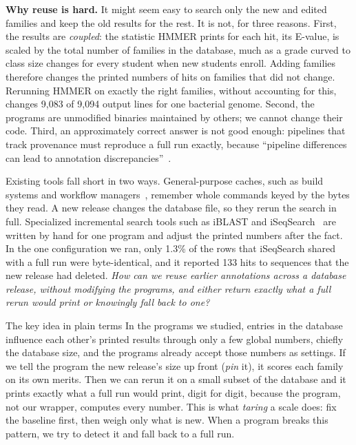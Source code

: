 \documentclass[letterpaper,twocolumn,10pt]{article}
\theoremstyle{definition}
\begin{document}
\textbf{Why reuse is hard.} It might seem easy to search only the new and edited families and keep the old results
for the rest. It is not, for three reasons. First, the results are \textit{coupled}: the statistic HMMER prints for
each hit, its E-value, is scaled by the total number of families in the database, much as a grade curved to class
size changes for every student when new students enroll. Adding families therefore changes the printed numbers of
hits on families that did not change. Rerunning HMMER on exactly the right families, without accounting for this,
changes 9{,}083 of 9{,}094 output lines for one bacterial genome.
Second, the programs are unmodified binaries
maintained by others; we cannot change their code. Third, an approximately correct answer is not good enough:
pipelines that track provenance must reproduce a full run exactly, because ``pipeline differences can lead to
annotation discrepancies''~\cite{chen2021img}.

Existing tools fall short in two ways. General\nobreakdash-purpose caches, such as build systems and workflow
managers~\cite{curtsinger2022riker,xie2026incr,shiptoski2023processcache,ditommaso2017nextflow,molder2021snakemake},
remember whole commands keyed by the bytes they read. A new release changes the database file, so they rerun the
search in full. Specialized incremental search tools such as iBLAST and iSeqSearch~\cite{dash2021iblast,yoo2025iseqsearch}
are written by hand for one program and adjust the printed numbers after the fact. In the one configuration we ran, only 1.3\% of the rows that iSeqSearch shared
with a full run were byte\nobreakdash-identical, and it reported 133 hits to sequences that the new release had deleted.
\textit{How can we reuse earlier annotations across a database release, without modifying the programs, and either
return exactly what a full rerun would print or knowingly fall back to one?}

\begin{plainbox}{The key idea in plain terms}
In the programs we studied, entries in the database influence each other's printed results through only a few
global numbers, chiefly the database size, and the programs already accept those numbers as settings. If we tell
the program the new release's size up front (\textit{pin} it), it scores each family on its own merits. Then we can
rerun it on a small subset of the database and it prints exactly what a full run would print, digit for digit,
because the program, not our wrapper, computes every number. This is what \textit{taring} a scale does: fix the
baseline first, then weigh only what is new. When a program breaks this pattern, we try to detect it and fall back to a
full run.
\end{plainbox}
\end{document}
